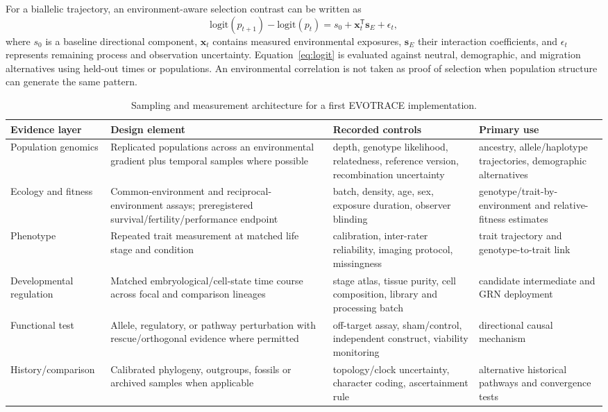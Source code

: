 \documentclass[conference]{IEEEtran}
\begin{document}
For a biallelic trajectory, an environment-aware selection contrast can be written as
\begin{equation}
\mathrm{logit}(p_{t+1})-\mathrm{logit}(p_t)=s_0+\mathbf{x}_t^{\mathsf{T}}\boldsymbol{s}_E+\epsilon_t,
\label{eq:logit}
\end{equation}
where $s_0$ is a baseline directional component, $\mathbf{x}_t$ contains measured environmental exposures, $\boldsymbol{s}_E$ their interaction coefficients, and $\epsilon_t$ represents remaining process and observation uncertainty. Equation~\eqref{eq:logit} is evaluated against neutral, demographic, and migration alternatives using held-out times or populations. An environmental correlation is not taken as proof of selection when population structure can generate the same pattern.

\begin{table}[t]
\caption{Sampling and measurement architecture for a first EVOTRACE implementation.}
\label{tab:sampling}
\centering
\footnotesize
\begin{tabular}{L{0.17\textwidth} L{0.25\textwidth} L{0.27\textwidth} L{0.22\textwidth}}
\toprule
\textbf{Evidence layer} & \textbf{Design element} & \textbf{Recorded controls} & \textbf{Primary use}\\
\midrule
Population genomics & Replicated populations across an environmental gradient plus temporal samples where possible & depth, genotype likelihood, relatedness, reference version, recombination uncertainty & ancestry, allele/haplotype trajectories, demographic alternatives\\
Ecology and fitness & Common-environment and reciprocal-environment assays; preregistered survival/fertility/performance endpoint & batch, density, age, sex, exposure duration, observer blinding & genotype/trait-by-environment and relative-fitness estimates\\
Phenotype & Repeated trait measurement at matched life stage and condition & calibration, inter-rater reliability, imaging protocol, missingness & trait trajectory and genotype-to-trait link\\
Developmental regulation & Matched embryological/cell-state time course across focal and comparison lineages & stage atlas, tissue purity, cell composition, library and processing batch & candidate intermediate and GRN deployment\\
Functional test & Allele, regulatory, or pathway perturbation with rescue/orthogonal evidence where permitted & off-target assay, sham/control, independent construct, viability monitoring & directional causal mechanism\\
History/comparison & Calibrated phylogeny, outgroups, fossils or archived samples when applicable & topology/clock uncertainty, character coding, ascertainment rule & alternative historical pathways and convergence tests\\
\bottomrule
\end{tabular}
\end{table}
\end{document}
